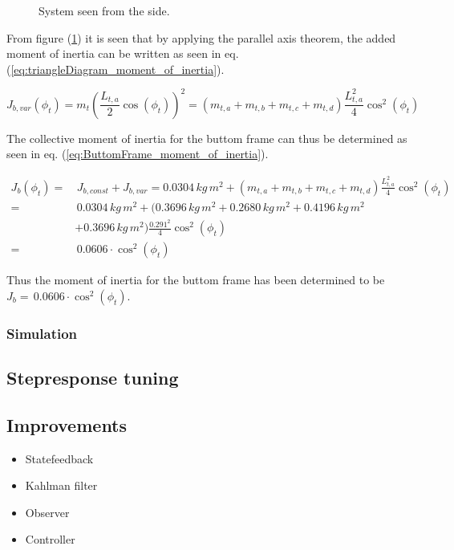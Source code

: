 \documentclass[../../main]{subfiles}
\begin{document}
\begin{figure}[H]
  \label{fig:TrekantDiagram}
  \centering
  \def\svgwidth{0.4\columnwidth}
  
  \caption{System seen from the side.}
\end{figure}

From figure (\ref{fig:TrekantDiagram}) it is seen that by applying the parallel axis theorem, the added moment of inertia can be written as seen in eq. (\ref{eq:triangleDiagram_moment_of_inertia}).

\begin{equation}
  \label{eq:triangleDiagram_moment_of_inertia}
  J_{b,var}(\phi_t) = m_{t} \left( \frac{L_{t,a}}{2} \cos(\phi_t) \right)^2 = ( m_{t,a} + m_{t,b} + m_{t,c} + m_{t,d} ) \frac{L_{t,a}^2}{4} \cos^2(\phi_t)
\end{equation}

The collective moment of inertia for the buttom frame can thus be determined as seen in eq. (\ref{eq:ButtomFrame_moment_of_inertia}).

\begin{equation}
  \label{eq:ButtomFrame_moment_of_inertia}
\begin{split}
    J_b(\phi_t) =& \, J_{b,const} + J_{b,var} = 0.0304 \si{\, kg \, m^2} + ( m_{t,a} + m_{t,b} + m_{t,c} + m_{t,d} ) \frac{L_{t,a}^2}{4} \cos^2(\phi_t)\\
    =& \, 0.0304 \si{\, kg \, m^2} + ( 0.3696 \si{\, kg \, m^2} + 0.2680 \si{\, kg \, m^2} + 0.4196 \si{\, kg \, m^2}\\
    &+ 0.3696 \si{\, kg \, m^2})\frac{0.291^2}{4}\cos^2(\phi_t)\\
    =& \, 0.0606\cdot \cos^2(\phi_t)
\end{split}
\end{equation}

Thus the moment of inertia for the buttom frame has been determined to be
\newline $J_b =\, 0.0606\cdot \cos^2(\phi_t)$.




\subsubsection{Simulation}

\subsection{Stepresponse tuning}


\subsection{Improvements}

\begin{itemize}
  \item Statefeedback
  \item Kahlman filter
  \item Observer
  \item Controller
\end{itemize}
\end{document}
